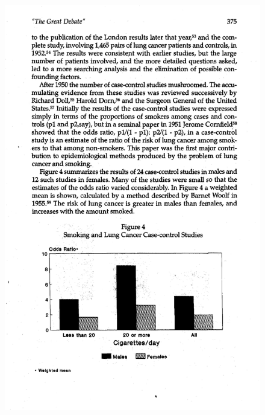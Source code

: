 \documentclass[notes=show]{beamer}
\begin{document}
\begin{frame}[plain]
	
	\begin{figure}
	\includegraphics[scale=0.5]{./lecture_includes/smoking_figure1.pdf}
	\end{figure}


\end{frame}
\end{document}
